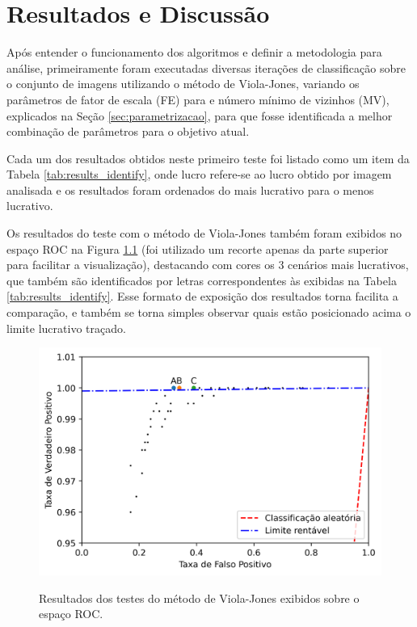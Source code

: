 \chapter{Resultados e Discussão}\label{cap:resultados}

Após entender o funcionamento dos algoritmos e definir a metodologia para análise, primeiramente foram executadas diversas iterações de classificação sobre o conjunto de imagens utilizando o método de Viola-Jones, variando os parâmetros de fator de escala (FE) para e número mínimo de vizinhos (MV), explicados na Seção \ref{sec:parametrizacao}, para que fosse identificada a melhor combinação de parâmetros para o objetivo atual.

Cada um dos resultados obtidos neste primeiro teste foi listado como um item da Tabela \ref{tab:results_identify}, onde lucro refere-se ao lucro obtido por imagem analisada e os resultados foram ordenados do mais lucrativo para o menos lucrativo.

Os resultados do teste com o método de Viola-Jones também foram exibidos no espaço ROC na Figura \ref{fig:results_roc} (foi utilizado um recorte apenas da parte superior para facilitar a visualização), destacando com cores os 3 cenários mais lucrativos, que também são identificados por letras correspondentes às exibidas na Tabela \ref{tab:results_identify}. Esse formato de exposição dos resultados torna facilita a comparação, e também se torna simples observar quais estão posicionado acima o limite lucrativo traçado.

\begin{figure}[htb]
    \centering
    \caption{Resultados dos testes do método de Viola-Jones exibidos sobre o espaço ROC.}
    \includegraphics[scale=1]{figs/curva_roc_results_viola.png}
    \label{fig:results_roc}
\end{figure}

